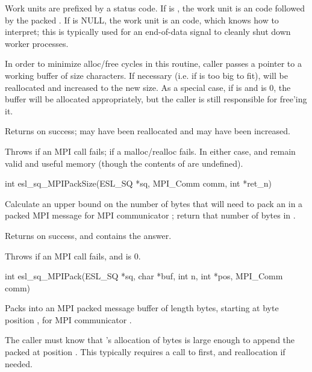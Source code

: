 \begin{sreapi}
Work units are prefixed by a status code. If  is
, the work unit is an  code followed by
the packed . If  is NULL, the work unit is an
 code, which  knows how to
interpret; this is typically used for an end-of-data
signal to cleanly shut down worker processes.

In order to minimize alloc/free cycles in this routine,
caller passes a pointer to a working buffer  of
size  characters. If necessary (i.e. if  is
too big to fit),  will be reallocated and 
increased to the new size. As a special case, if 
is  and  is 0, the buffer will be
allocated appropriately, but the caller is still
responsible for free'ing it.

Returns  on success;  may have been reallocated and
 may have been increased.

Throws  if an MPI call fails;  if a malloc/realloc
fails. In either case,  and  remain valid and useful
memory (though the contents of  are undefined). 



\hypertarget{func:esl_sq_MPIPackSize()}
{\item[int esl\_sq\_MPIPackSize(ESL\_SQ *sq, MPI\_Comm comm, int *ret\_n)]}

Calculate an upper bound on the number of bytes
that  will need to pack an 
 in a packed MPI message for MPI communicator
; return that number of bytes in .

Returns  on success, and  contains the answer.

Throws  if an MPI call fails, and  is 0.


\hypertarget{func:esl_sq_MPIPack()}
{\item[int esl\_sq\_MPIPack(ESL\_SQ *sq, char *buf, int n, int *pos, MPI\_Comm comm)]}

Packs   into an MPI packed message buffer 
of length  bytes, starting at byte position ,
for MPI communicator .

The caller must know that 's allocation of 
bytes is large enough to append the packed  at
position . This typically requires a call to
 first, and reallocation if
needed.


\end{sreapi}
